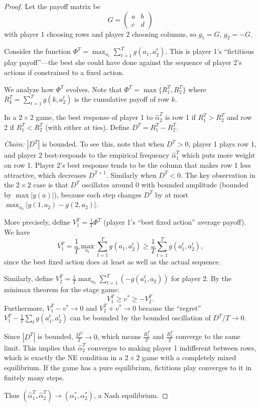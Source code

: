 \documentclass[11pt,a4paper]{article}
\theoremstyle{definition}
\theoremstyle{plain}
\theoremstyle{remark}
\begin{document}
\begin{proof}
Let the payoff matrix be
\[
    G = \begin{pmatrix} a & b \\ c & d \end{pmatrix}
\]
with player 1 choosing rows and player 2 choosing columns, so $g_1 = G$, $g_2 = -G$.

Consider the function $\Phi^T = \max_{a_1} \sum_{t=1}^T g(a_1, a_2^t)$. This is player 1's
``fictitious play payoff''---the best she could have done against the sequence of player 2's
actions if constrained to a fixed action.

We analyze how $\Phi^T$ evolves. Note that $\Phi^T = \max\{R_1^T, R_2^T\}$ where
$R_k^T = \sum_{t=1}^T g(k, a_2^t)$ is the cumulative payoff of row $k$.

In a $2 \times 2$ game, the best response of player 1 to $\hat{\alpha}_2^T$ is row 1 if
$R_1^T > R_2^T$ and row 2 if $R_1^T < R_2^T$ (with either at ties). Define
$D^T = R_1^T - R_2^T$.

\emph{Claim:} $|D^T|$ is bounded. To see this, note that when $D^T > 0$, player 1 plays
row 1, and player 2 best-responds to the empirical frequency $\hat{\alpha}_1^T$ which puts
more weight on row 1. Player 2's best response tends to be the column that makes row 1
less attractive, which decreases $D^{T+1}$. Similarly when $D^T < 0$. The key observation
in the $2 \times 2$ case is that $D^T$ oscillates around 0 with bounded amplitude
(bounded by $\max |g(a)|$), because each step changes $D^T$ by at most
$\max_{a_2} |g(1,a_2) - g(2,a_2)|$.

More precisely, define $V_1^T = \frac{1}{T}\Phi^T$ (player 1's ``best fixed action''
average payoff). We have
\[
    V_1^T = \frac{1}{T} \max_{a_1} \sum_{t=1}^T g(a_1, a_2^t)
    \geq \frac{1}{T} \sum_{t=1}^T g(a_1^t, a_2^t),
\]
since the best fixed action does at least as well as the actual sequence.

Similarly, define $V_2^T = \frac{1}{T} \max_{a_2} \sum_{t=1}^T (-g(a_1^t, a_2))$ for
player 2. By the minimax theorem for the stage game:
\[
    V_1^T \geq v^* \geq -V_2^T.
\]
Furthermore, $V_1^T - v^* \to 0$ and $V_2^T + v^* \to 0$ because the ``regret''
$V_1^T - \frac{1}{T}\sum_t g(a_1^t, a_2^t)$ can be bounded by the bounded oscillation of
$D^T/T \to 0$.

Since $|D^T|$ is bounded, $\frac{D^T}{T} \to 0$, which means $\frac{R_1^T}{T}$ and
$\frac{R_2^T}{T}$ converge to the same limit. This implies that $\hat{\alpha}_2^T$
converges to making player 1 indifferent between rows, which is exactly the NE condition
in a $2 \times 2$ game with a completely mixed equilibrium. If the game has a pure
equilibrium, fictitious play converges to it in finitely many steps.

Thus $(\hat{\alpha}_1^T, \hat{\alpha}_2^T) \to (\alpha_1^*, \alpha_2^*)$, a Nash
equilibrium.
\end{proof}
\end{document}
